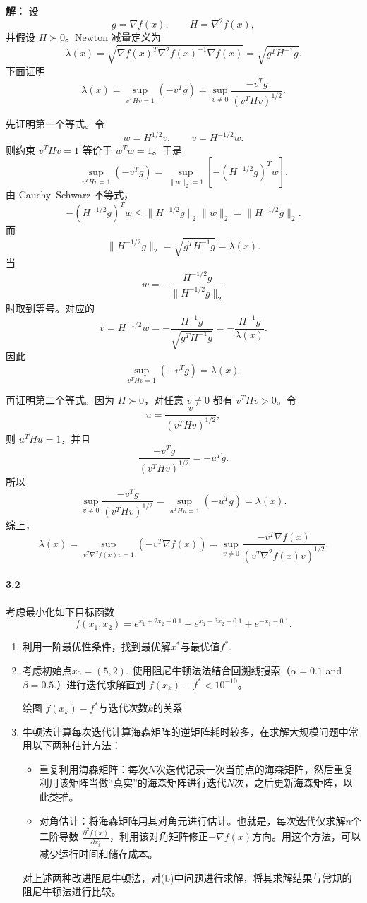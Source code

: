 \documentclass[12pt,a4paper]{article}
\begin{document}
\textbf{解：}
设
\[
  g=\nabla f(x),\qquad H=\nabla^2 f(x),
\]
并假设 $H\succ0$。Newton 减量定义为
\[
  \lambda(x)=\sqrt{\nabla f(x)^T\nabla^2 f(x)^{-1}\nabla f(x)}
  =\sqrt{g^TH^{-1}g}.
\]
下面证明
\[
  \lambda(x)
  =
  \sup_{v^THv=1}(-v^Tg)
  =
  \sup_{v\ne0}
  \frac{-v^Tg}{(v^THv)^{1/2}}.
\]

先证明第一个等式。令
\[
  w=H^{1/2}v,\qquad v=H^{-1/2}w.
\]
则约束 $v^THv=1$ 等价于 $w^Tw=1$。于是
\[
  \sup_{v^THv=1}(-v^Tg)
  =
  \sup_{\|w\|_2=1}\left[-(H^{-1/2}g)^Tw\right].
\]
由 Cauchy--Schwarz 不等式，
\[
  -(H^{-1/2}g)^Tw
  \leq
  \|H^{-1/2}g\|_2\|w\|_2
  =
  \|H^{-1/2}g\|_2.
\]
而
\[
  \|H^{-1/2}g\|_2
  =
  \sqrt{g^TH^{-1}g}
  =
  \lambda(x).
\]
当
\[
  w=-\frac{H^{-1/2}g}{\|H^{-1/2}g\|_2}
\]
时取到等号。对应的
\[
  v=H^{-1/2}w
  =
  -\frac{H^{-1}g}{\sqrt{g^TH^{-1}g}}
  =
  -\frac{H^{-1}g}{\lambda(x)}.
\]
因此
\[
  \sup_{v^THv=1}(-v^Tg)=\lambda(x).
\]

再证明第二个等式。因为 $H\succ0$，对任意 $v\ne0$ 都有 $v^THv>0$。令
\[
  u=\frac{v}{(v^THv)^{1/2}},
\]
则 $u^THu=1$，并且
\[
  \frac{-v^Tg}{(v^THv)^{1/2}}
  =
  -u^Tg.
\]
所以
\[
  \sup_{v\ne0}
  \frac{-v^Tg}{(v^THv)^{1/2}}
  =
  \sup_{u^THu=1}(-u^Tg)
  =
  \lambda(x).
\]
综上，
\[
  \boxed{
  \lambda(x)
  =
  \sup_{v^T\nabla^2 f(x)v=1}(-v^T\nabla f(x))
  =
  \sup_{v\ne0}
  \frac{-v^T\nabla f(x)}
  {(v^T\nabla^2 f(x)v)^{1/2}}
  }.
\]

\paragraph{3.2}
考虑最小化如下目标函数
$$f(x_1,x_2)=e^{x_1+2x_2-0.1}+e^{x_1-3x_2-0.1}+e^{-x_1-0.1}.$$

\begin{enumerate}
	\item[(a)] 利用一阶最优性条件，找到最优解$x^*$与最优值$f^*$.
	
	\item[(b)] 考虑初始点$x_0=(5,2)$. 使用阻尼牛顿法法结合回溯线搜索（$\alpha=0.1$ and $\beta=0.5$.）进行迭代求解直到 $f(x_k)-f^*<10^{-10}$。

    绘图 $f(x_k)- f^*$与迭代次数$k$的关系
	
	\item[(c)] 牛顿法计算每次迭代计算海森矩阵的逆矩阵耗时较多，在求解大规模问题中常用以下两种估计方法：
	
	\begin{itemize}
		\item 重复利用海森矩阵：每次$N$次迭代记录一次当前点的海森矩阵，然后重复利用该矩阵当做“真实”的海森矩阵进行迭代$N$次，之后更新海森矩阵，以此类推。		
		\item 对角估计：将海森矩阵用其对角元进行估计。也就是，每次迭代仅求解$n$个二阶导数
        $\frac{\partial^2 f(x)}{\partial x_i^2}$，利用该对角矩阵修正$-\nabla f(x)$方向。用这个方法，可以减少运行时间和储存成本。	
	\end{itemize}
对上述两种改进阻尼牛顿法，对(b)中问题进行求解，将其求解结果与常规的阻尼牛顿法进行比较。
\end{enumerate}
\end{document}

